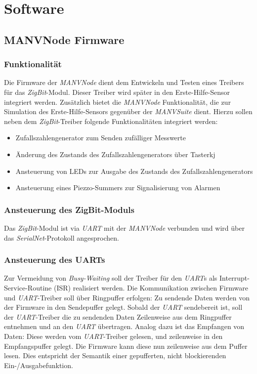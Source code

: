 \section{Software}
\subsection{MANVNode Firmware}

\subsubsection{Funktionalität}
Die Firmware der \emph{MANVNode} dient dem Entwickeln und Testen eines Treibers für das \emph{ZigBit}-Modul. Dieser
Treiber wird später in den Erste-Hilfe-Sensor integriert werden. Zusätzlich bietet die \emph{MANVNode} Funktionalität,
die zur Simulation des Erste-Hilfe-Sensors gegenüber der \emph{MANVSuite} dient. Hierzu sollen neben dem 
\emph{ZigBit}-Treiber folgende Funktionalitäten integriert werden:

\begin{itemize}
    \item Zufallszahlengenerator zum Senden zufälliger Messwerte
    \item Änderung des Zustands des Zufallszahlengenerators über Tasterkj
    \item Ansteuerung von LEDs zur Ausgabe des Zustands des Zufallszahlengenerators
    \item Ansteuerung eines Piezzo-Summers zur Signalisierung von Alarmen
\end{itemize}


\subsubsection{Ansteuerung des ZigBit-Moduls}
Das \emph{ZigBit}-Modul ist via \emph{UART} mit der \emph{MANVNode} verbunden und wird über das \emph{SerialNet}-Protokoll
angesprochen.

\subsubsection{Ansteuerung des UARTs}
Zur Vermeidung von \emph{Busy-Waiting} soll der Treiber für den \emph{UART}s als Interrupt-Service-Routine (ISR)
realisiert werden. Die Kommunikation zwischen Firmware und \emph{UART}-Treiber soll über Ringpuffer erfolgen:
Zu sendende Daten werden von der Firmware in den Sendepuffer gelegt. Sobald der \emph{UART} sendebereit ist, 
soll der \emph{UART}-Treiber die zu sendenden Daten Zeilenweise aus dem Ringpuffer entnehmen und an
den \emph{UART} übertragen. Analog dazu ist das Empfangen von Daten: Diese werden vom \emph{UART}-Treiber gelesen,
und zeilenweise in den Empfangspuffer gelegt. Die Firmware kann diese nun zeilenweise aus dem Puffer lesen.
Dies entspricht der Semantik einer gepufferten, nicht blockierenden Ein-/Ausgabefunktion.


